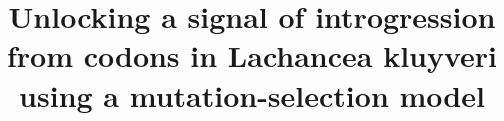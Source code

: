 \documentclass[doublespacing,linenumbers]{bmcart}
\begin{document}
  
\begin{frontmatter}

\begin{fmbox}
  
\title{Unlocking a signal of introgression from codons in Lachancea kluyveri using a mutation-selection model}

\author[
   addressref={aff1, aff2, aff3},                   %
   corref={aff3},                       %
   email={cedric.landerer@gmail.com}   %
]{ }
\author[
   addressref={aff1,aff2},
   email={bomeara@utk.edu}
]{ }
\author[
   addressref={aff2,aff4},
   email={russell.zaretzki@gmail.com}
]{ }
\author[
   addressref={aff1,aff2},
   email={mikeg@utk.edu}
]{ }



\end{fmbox}
\end{frontmatter}
\end{document}
